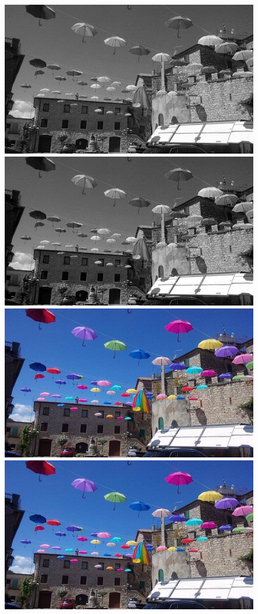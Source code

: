 \documentclass{article}
\begin{document}
	\begin{figure}[!ht]	
	\centering	
	\includegraphics{img/gray-obraz1}	
	\includegraphics{img/arytmetyczne/sumowanie_stala-gray}
	\includegraphics{img/rgb-obraz1}	
	\includegraphics{img/arytmetyczne/sumowanie_stala-rgb}

\end{figure}
\end{document}
